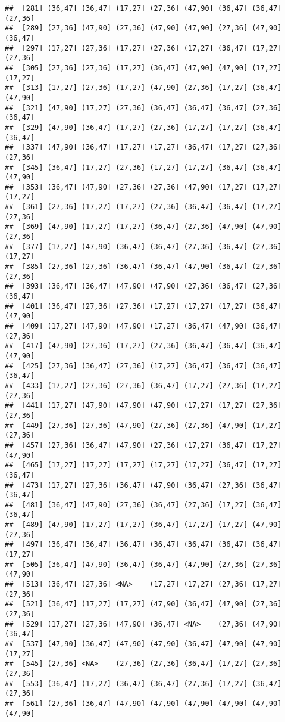 \documentclass[12pt,]{article}
\begin{document}
\begin{verbatim}
##  [281] (36,47] (36,47] (17,27] (27,36] (47,90] (36,47] (36,47] (27,36]
##  [289] (27,36] (47,90] (27,36] (47,90] (47,90] (27,36] (47,90] (36,47]
##  [297] (17,27] (27,36] (17,27] (27,36] (17,27] (36,47] (17,27] (27,36]
##  [305] (27,36] (27,36] (17,27] (36,47] (47,90] (47,90] (17,27] (17,27]
##  [313] (17,27] (27,36] (17,27] (47,90] (27,36] (17,27] (36,47] (47,90]
##  [321] (47,90] (17,27] (27,36] (36,47] (36,47] (36,47] (27,36] (36,47]
##  [329] (47,90] (36,47] (17,27] (27,36] (17,27] (17,27] (36,47] (36,47]
##  [337] (47,90] (36,47] (17,27] (17,27] (36,47] (17,27] (27,36] (27,36]
##  [345] (36,47] (17,27] (27,36] (17,27] (17,27] (36,47] (36,47] (47,90]
##  [353] (36,47] (47,90] (27,36] (27,36] (47,90] (17,27] (17,27] (17,27]
##  [361] (27,36] (17,27] (17,27] (27,36] (36,47] (36,47] (17,27] (27,36]
##  [369] (47,90] (17,27] (17,27] (36,47] (27,36] (47,90] (47,90] (27,36]
##  [377] (17,27] (47,90] (36,47] (36,47] (27,36] (36,47] (27,36] (17,27]
##  [385] (27,36] (27,36] (36,47] (36,47] (47,90] (36,47] (27,36] (27,36]
##  [393] (36,47] (36,47] (47,90] (47,90] (27,36] (36,47] (27,36] (36,47]
##  [401] (36,47] (27,36] (27,36] (17,27] (17,27] (17,27] (36,47] (47,90]
##  [409] (17,27] (47,90] (47,90] (17,27] (36,47] (47,90] (36,47] (27,36]
##  [417] (47,90] (27,36] (17,27] (27,36] (36,47] (36,47] (36,47] (47,90]
##  [425] (27,36] (36,47] (27,36] (17,27] (36,47] (36,47] (36,47] (36,47]
##  [433] (17,27] (27,36] (27,36] (36,47] (17,27] (27,36] (17,27] (27,36]
##  [441] (17,27] (47,90] (47,90] (47,90] (17,27] (17,27] (27,36] (27,36]
##  [449] (27,36] (27,36] (47,90] (27,36] (27,36] (47,90] (17,27] (27,36]
##  [457] (27,36] (36,47] (47,90] (27,36] (17,27] (36,47] (17,27] (47,90]
##  [465] (17,27] (17,27] (17,27] (17,27] (17,27] (36,47] (17,27] (36,47]
##  [473] (17,27] (27,36] (36,47] (47,90] (36,47] (27,36] (36,47] (36,47]
##  [481] (36,47] (47,90] (27,36] (36,47] (27,36] (17,27] (36,47] (36,47]
##  [489] (47,90] (17,27] (17,27] (36,47] (17,27] (17,27] (47,90] (27,36]
##  [497] (36,47] (36,47] (36,47] (36,47] (36,47] (36,47] (36,47] (17,27]
##  [505] (36,47] (47,90] (36,47] (36,47] (47,90] (27,36] (27,36] (47,90]
##  [513] (36,47] (27,36] <NA>    (17,27] (17,27] (27,36] (17,27] (27,36]
##  [521] (36,47] (17,27] (17,27] (47,90] (36,47] (47,90] (27,36] (27,36]
##  [529] (17,27] (27,36] (47,90] (36,47] <NA>    (27,36] (47,90] (36,47]
##  [537] (47,90] (36,47] (47,90] (47,90] (36,47] (47,90] (47,90] (17,27]
##  [545] (27,36] <NA>    (27,36] (27,36] (36,47] (17,27] (27,36] (27,36]
##  [553] (36,47] (17,27] (36,47] (36,47] (27,36] (17,27] (36,47] (27,36]
##  [561] (27,36] (36,47] (47,90] (47,90] (47,90] (47,90] (47,90] (47,90]

\end{verbatim}
\end{document}
